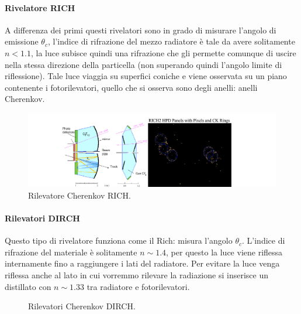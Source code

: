 \paragraph{Rivelatore RICH}%
A differenza dei primi questi rivelatori sono in grado di misurare l'angolo di emissione $\theta_{c}$, l'indice di rifrazione del mezzo radiatore è tale da avere solitamente $n < 1.1$, la luce subisce quindi una rifrazione che gli permette comunque di uscire nella stessa direzione della particella (non superando quindi l'angolo limite di riflessione). Tale luce viaggia su superfici coniche e viene osservata su un piano contenente i fotorilevatori, quello che si osserva sono degli anelli: anelli Cherenkov. 
\begin{figure}[H]
	\centering
	\includegraphics[width=1\textwidth]{immagini/RICH.png}
	\caption{Rilevatore Cherenkov RICH.}
	\label{fig:immagini-RICH-png}
\end{figure}

\paragraph{Rilevatori DIRCH}%
Questo tipo di rivelatore funziona come il Rich: misura l'angolo $\theta_{c}$. L'indice di rifrazione del materiale è solitamente $n\sim 1.4$, per questo la luce viene riflessa internamente fino a raggiungere i lati del radiatore. Per evitare la luce venga riflessa anche al lato in cui vorremmo rilevare la radiazione si inserisce un distillato con $n \sim 1.33$ tra radiatore e fotorilevatori.
\begin{figure}[ht]
    \centering
    \caption{Rilevatori Cherenkov DIRCH.}
    \label{fig:rilevatori-cherenkov-dirch}
\end{figure}

